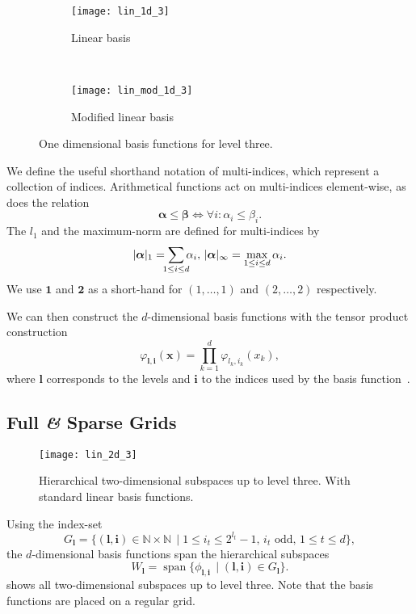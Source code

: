 \begin{figure}[H]
  \centering
  \begin{subfigure}[c]{0.4\textwidth}
  \centering
  \texttt{[image: lin\_1d\_3]}  
  \caption{Linear basis}
  \end{subfigure}~
  \begin{subfigure}[c]{0.4\textwidth}
  \centering
  \texttt{[image: lin\_mod\_1d\_3]}  
  \caption{Modified linear basis}
  \end{subfigure}
\caption{One dimensional basis functions for level three.}
  \label{fig:oned-basis}
\end{figure}

We define the useful shorthand notation of multi-indices, which represent a
collection of indices.
Arithmetical functions act on multi-indices element-wise, as does the relation
\begin{equation*}
  \bm{\alpha} \leq \bm{\beta} \iff \forall i\colon \alpha_i \leq \beta_i.
\end{equation*}
The \(l_1\) and the maximum-norm are defined for multi-indices by
\begin{equation*}
  \vert \bm{\alpha} \vert_1 = \sum_{\mathclap{1 \leq i \leq d}} \alpha_i, \,  \vert \bm{\alpha} \vert_\infty = \max_{1 \leq i \leq d} \alpha_i.
\end{equation*}
We use \(\bm{1}\) and \(\bm{2}\) as a short-hand for \((1, \ldots, 1)\) and
\((2, \ldots, 2)\) respectively.

We can then construct the \(d\)-dimensional basis functions with the tensor product construction
\begin{equation*}
\varphi_{\bm{l}, \bm{i}} (\bm{x}) = \prod_{k=1}^d \varphi_{l_k, i_k} (x_k),
\end{equation*}
where \(\bm{l}\) corresponds to the levels and \(\bm{i}\) to the indices used by the basis function~\cite{bungartzSparse}.

\subsection{Full \textit{\&} Sparse Grids}
\begin{figure}[htb]
  \centering
  \texttt{[image: lin\_2d\_3]}
  \caption{Hierarchical two-dimensional subspaces up to level three.
  With standard linear basis functions.}\label{fig:hier-subspaces}
\end{figure}
Using the index-set~\cite{sparse-parsimony}
\begin{equation*}
 G_{\bm{l}} = \{(\bm{l, i}) \in \mathbb{N} \times \mathbb{N} \, \mid 1 \leq i_t \leq 2^{l_t} -1,\, i_t \text{ odd},\, 1 \leq t \leq d\},
\end{equation*}
the \(d\)-dimensional basis functions span the hierarchical subspaces
\begin{equation*}
  W_{\bm{l}} = \operatorname{span}\{\phi_{\bm{l},\bm{i}} \, \mid (\bm{l}, \bm{i}) \in G_{\bm{l}}\}.
\end{equation*}
 shows all two-dimensional subspaces up to level three.
Note that the basis functions are placed on a regular grid.

